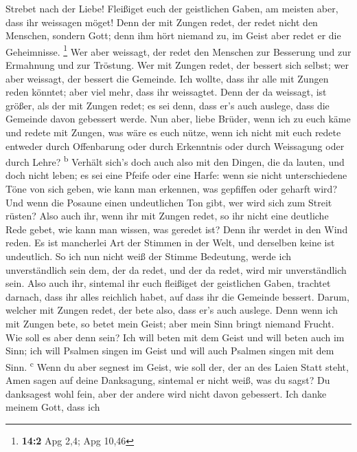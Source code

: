  Strebet nach der Liebe! Fleißiget euch der geistlichen
Gaben, am meisten aber, dass ihr weissagen möget!  Denn
der mit Zungen redet, der redet nicht den Menschen, sondern Gott; denn
ihm hört niemand zu, im Geist aber redet er die Geheimnisse. \footnote{\textbf{14:2}
  Apg 2,4; Apg 10,46}  Wer aber weissagt, der redet den
Menschen zur Besserung und zur Ermahnung und zur Tröstung.
 Wer mit Zungen redet, der bessert sich selbst; wer aber
weissagt, der bessert die Gemeinde.  Ich wollte, dass ihr
alle mit Zungen reden könntet; aber viel mehr, dass ihr weissagtet. Denn
der da weissagt, ist größer, als der mit Zungen redet; es sei denn, dass
er's auch auslege, dass die Gemeinde davon gebessert werde.
 Nun aber, liebe Brüder, wenn ich zu euch käme und redete
mit Zungen, was wäre es euch nütze, wenn ich nicht mit euch redete
entweder durch Offenbarung oder durch Erkenntnis oder durch Weissagung
oder durch Lehre? \textsuperscript{b}  Verhält sich's doch
auch also mit den Dingen, die da lauten, und doch nicht leben; es sei
eine Pfeife oder eine Harfe: wenn sie nicht unterschiedene Töne von sich
geben, wie kann man erkennen, was gepfiffen oder geharft wird?
 Und wenn die Posaune einen undeutlichen Ton gibt, wer
wird sich zum Streit rüsten?  Also auch ihr, wenn ihr mit
Zungen redet, so ihr nicht eine deutliche Rede gebet, wie kann man
wissen, was geredet ist? Denn ihr werdet in den Wind reden.
 Es ist mancherlei Art der Stimmen in der Welt, und
derselben keine ist undeutlich.  So ich nun nicht weiß
der Stimme Bedeutung, werde ich unverständlich sein dem, der da redet,
und der da redet, wird mir unverständlich sein.  Also
auch ihr, sintemal ihr euch fleißiget der geistlichen Gaben, trachtet
darnach, dass ihr alles reichlich habet, auf dass ihr die Gemeinde
bessert.  Darum, welcher mit Zungen redet, der bete also,
dass er's auch auslege.  Denn wenn ich mit Zungen bete,
so betet mein Geist; aber mein Sinn bringt niemand Frucht.
 Wie soll es aber denn sein? Ich will beten mit dem Geist
und will beten auch im Sinn; ich will Psalmen singen im Geist und will
auch Psalmen singen mit dem Sinn. \textsuperscript{c} 
Wenn du aber segnest im Geist, wie soll der, der an des Laien Statt
steht, Amen sagen auf deine Danksagung, sintemal er nicht weiß, was du
sagst?  Du danksagest wohl fein, aber der andere wird
nicht davon gebessert.  Ich danke meinem Gott, dass ich
